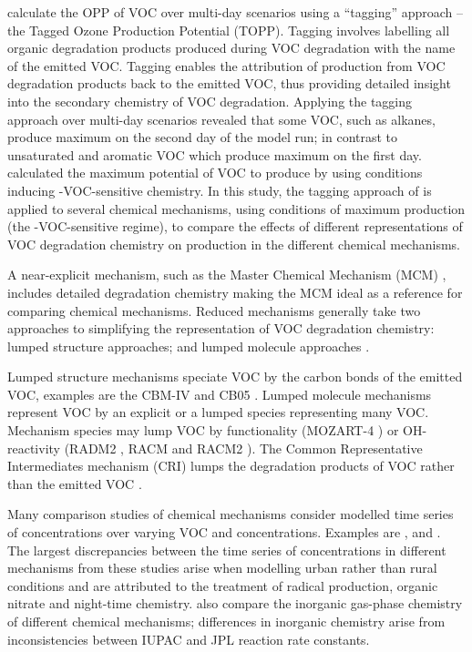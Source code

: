 \citet{Butler:2011} calculate the OPP of VOC over multi-day scenarios using a ``tagging'' approach -- the Tagged Ozone Production Potential (TOPP). 
Tagging involves labelling all organic degradation products produced during VOC degradation with the name of the emitted VOC.
Tagging enables the attribution of  production from VOC degradation products back to the emitted VOC, thus providing detailed insight into the secondary chemistry of VOC degradation.
Applying the tagging approach over multi-day scenarios revealed that some VOC, such as alkanes, produce maximum  on the second day of the model run; in contrast to unsaturated and aromatic VOC which produce maximum  on the first day.
\citet{Butler:2011} calculated the maximum potential of VOC to produce  by using  conditions inducing -VOC-sensitive chemistry.
In this study, the tagging approach of \citet{Butler:2011} is applied to several chemical mechanisms, using conditions of maximum  production (the -VOC-sensitive regime), to compare the effects of different representations of VOC degradation chemistry on  production in the different chemical mechanisms.

A near-explicit mechanism, such as the Master Chemical Mechanism (MCM) \citep{Jenkin:2003, Saunders:2003, Bloss:2005}, includes detailed degradation chemistry making the MCM ideal as a reference for comparing chemical mechanisms.
Reduced mechanisms generally take two approaches to simplifying the representation of VOC degradation chemistry: lumped structure approaches; and lumped molecule approaches \citep{Dodge:2000}. 

Lumped structure mechanisms speciate VOC by the carbon bonds of the emitted VOC, examples are the CBM-IV \citep{Gery:1989} and CB05 \citep{Yarwood:2005}.
Lumped molecule mechanisms represent VOC by an explicit or a lumped species representing many VOC. 
Mechanism species may lump VOC by functionality (MOZART-4 \citep{Emmons:2010}) or OH-reactivity (RADM2 \citep{Stockwell:1990}, RACM \citep{Stockwell:1997} and RACM2 \citep{Goliff:2013}).
The Common Representative Intermediates mechanism (CRI) lumps the degradation products of VOC rather than the emitted VOC \citep{Jenkin:2008}.

Many comparison studies of chemical mechanisms consider modelled time series of  concentrations over varying VOC and  concentrations.
Examples are \citet{Dunker:1984}, \citet{Kuhn:1998} and \citet{Emmerson:2009}.
The largest discrepancies between the time series of  concentrations in different mechanisms from these studies arise when modelling urban rather than rural conditions and are attributed to the treatment of radical production, organic nitrate and night-time chemistry.
\citet{Emmerson:2009} also compare the inorganic gas-phase chemistry of different chemical mechanisms; differences in inorganic chemistry arise from inconsistencies between IUPAC and JPL reaction rate constants.

